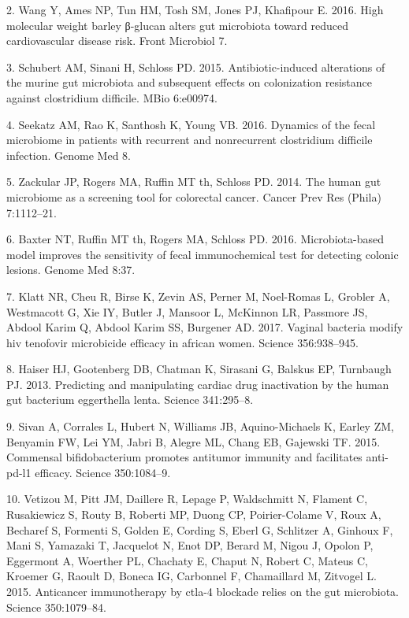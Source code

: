 \documentclass[12pt,]{article}
\begin{document}
\hypertarget{ref-Wang_cvdrisk_2016}{}
2. Wang Y, Ames NP, Tun HM, Tosh SM, Jones PJ, Khafipour E. 2016. High
molecular weight barley β-glucan alters gut microbiota toward reduced
cardiovascular disease risk. Front Microbiol 7.

\hypertarget{ref-Schubert_cdiff_2015}{}
3. Schubert AM, Sinani H, Schloss PD. 2015. Antibiotic-induced
alterations of the murine gut microbiota and subsequent effects on
colonization resistance against clostridium difficile. MBio 6:e00974.

\hypertarget{ref-Seekatz_cdiff_2016}{}
4. Seekatz AM, Rao K, Santhosh K, Young VB. 2016. Dynamics of the fecal
microbiome in patients with recurrent and nonrecurrent clostridium
difficile infection. Genome Med 8.

\hypertarget{ref-zackular_CRC_2014}{}
5. Zackular JP, Rogers MA, Ruffin MT th, Schloss PD. 2014. The human gut
microbiome as a screening tool for colorectal cancer. Cancer Prev Res
(Phila) 7:1112--21.

\hypertarget{ref-baxter_FIT_2016}{}
6. Baxter NT, Ruffin MT th, Rogers MA, Schloss PD. 2016.
Microbiota-based model improves the sensitivity of fecal immunochemical
test for detecting colonic lesions. Genome Med 8:37.

\hypertarget{ref-Klatt_microbicide_2017}{}
7. Klatt NR, Cheu R, Birse K, Zevin AS, Perner M, Noel-Romas L, Grobler
A, Westmacott G, Xie IY, Butler J, Mansoor L, McKinnon LR, Passmore JS,
Abdool Karim Q, Abdool Karim SS, Burgener AD. 2017. Vaginal bacteria
modify hiv tenofovir microbicide efficacy in african women. Science
356:938--945.

\hypertarget{ref-Haiser_cardiac_2013}{}
8. Haiser HJ, Gootenberg DB, Chatman K, Sirasani G, Balskus EP,
Turnbaugh PJ. 2013. Predicting and manipulating cardiac drug
inactivation by the human gut bacterium eggerthella lenta. Science
341:295--8.

\hypertarget{ref-Sivan_cancer_2015}{}
9. Sivan A, Corrales L, Hubert N, Williams JB, Aquino-Michaels K, Earley
ZM, Benyamin FW, Lei YM, Jabri B, Alegre ML, Chang EB, Gajewski TF.
2015. Commensal bifidobacterium promotes antitumor immunity and
facilitates anti-pd-l1 efficacy. Science 350:1084--9.

\hypertarget{ref-Vetizou_cancer_2015}{}
10. Vetizou M, Pitt JM, Daillere R, Lepage P, Waldschmitt N, Flament C,
Rusakiewicz S, Routy B, Roberti MP, Duong CP, Poirier-Colame V, Roux A,
Becharef S, Formenti S, Golden E, Cording S, Eberl G, Schlitzer A,
Ginhoux F, Mani S, Yamazaki T, Jacquelot N, Enot DP, Berard M, Nigou J,
Opolon P, Eggermont A, Woerther PL, Chachaty E, Chaput N, Robert C,
Mateus C, Kroemer G, Raoult D, Boneca IG, Carbonnel F, Chamaillard M,
Zitvogel L. 2015. Anticancer immunotherapy by ctla-4 blockade relies on
the gut microbiota. Science 350:1079--84.
\end{document}

